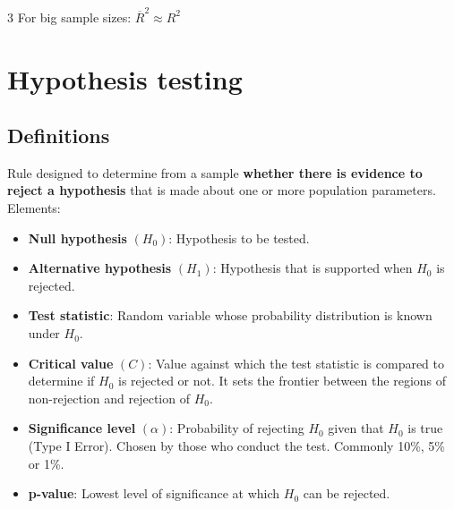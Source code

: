 \documentclass[10pt, a4paper, landscape]{article}
\begin{document}
\begin{multicols}{3}
For big sample sizes: \( \overline{R}^{2} \approx R^{2} \)

\section*{Hypothesis testing}

\subsection*{Definitions}

Rule designed to determine from a sample \textbf{whether there is evidence to reject a hypothesis} that is made about one or more population parameters. Elements:

\begin{itemize}[leftmargin=*]
	\item \textbf{Null hypothesis} \( (H_{0}) \): Hypothesis to be tested.
	\item \textbf{Alternative hypothesis} \( (H_{1}) \): Hypothesis that is supported when \( H_{0} \) is rejected.
	\item \textbf{Test statistic}: Random variable whose probability distribution is known under \( H_{0} \).
	\item \textbf{Critical value} \( (C) \): Value against which the test statistic is compared to determine if \( H_{0} \) is rejected or not. It sets the frontier between the regions of non-rejection and rejection of \( H_{0} \).
	\item \textbf{Significance level} \( (\alpha) \): Probability of rejecting \( H_{0} \) given that \( H_{0} \) is true (Type I Error). Chosen by those who conduct the test. Commonly 10\%, 5\% or 1\%.
	\item \textbf{p-value}: Lowest level of significance at which \( H_{0} \) can be rejected.
\end{itemize}


\end{multicols}
\end{document}
